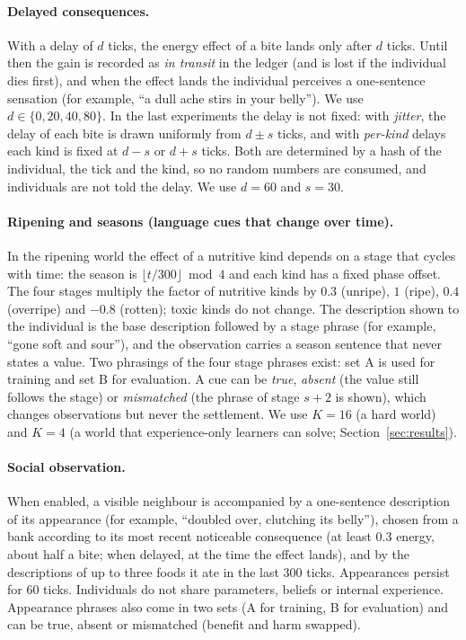 \paragraph{Delayed consequences.}
With a delay of $d$ ticks, the energy effect of a bite lands only after $d$ ticks. Until then the gain is recorded as \emph{in transit} in the ledger (and is lost if the individual dies first), and when the effect lands the individual perceives a one-sentence sensation (for example, ``a dull ache stirs in your belly''). We use $d\in\{0,20,40,80\}$. In the last experiments the delay is not fixed: with \emph{jitter}, the delay of each bite is drawn uniformly from $d\pm s$ ticks, and with \emph{per-kind} delays each kind is fixed at $d-s$ or $d+s$ ticks. Both are determined by a hash of the individual, the tick and the kind, so no random numbers are consumed, and individuals are not told the delay. We use $d=60$ and $s=30$.

\paragraph{Ripening and seasons (language cues that change over time).}
In the ripening world the effect of a nutritive kind depends on a stage that cycles with time: the season is $\lfloor t/300\rfloor \bmod 4$ and each kind has a fixed phase offset. The four stages multiply the factor of nutritive kinds by $0.3$ (unripe), $1$ (ripe), $0.4$ (overripe) and $-0.8$ (rotten); toxic kinds do not change. The description shown to the individual is the base description followed by a stage phrase (for example, ``gone soft and sour''), and the observation carries a season sentence that never states a value. Two phrasings of the four stage phrases exist: set A is used for training and set B for evaluation. A cue can be \emph{true}, \emph{absent} (the value still follows the stage) or \emph{mismatched} (the phrase of stage $s+2$ is shown), which changes observations but never the settlement. We use $K=16$ (a hard world) and $K=4$ (a world that experience-only learners can solve; Section~\ref{sec:results}).

\paragraph{Social observation.}
When enabled, a visible neighbour is accompanied by a one-sentence description of its appearance (for example, ``doubled over, clutching its belly''), chosen from a bank according to its most recent noticeable consequence (at least 0.3 energy, about half a bite; when delayed, at the time the effect lands), and by the descriptions of up to three foods it ate in the last 300 ticks. Appearances persist for 60 ticks. Individuals do not share parameters, beliefs or internal experience. Appearance phrases also come in two sets (A for training, B for evaluation) and can be true, absent or mismatched (benefit and harm swapped).

